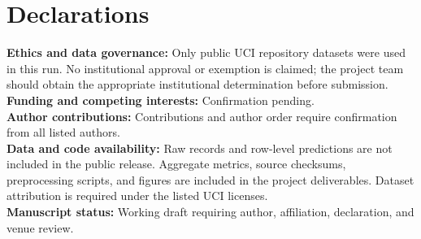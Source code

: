 \documentclass[conference]{IEEEtran}
\begin{document}
\section*{Declarations}
\textbf{Ethics and data governance:} Only public UCI repository datasets were used in this run. No institutional approval or exemption is claimed; the project team should obtain the appropriate institutional determination before submission.\\
\textbf{Funding and competing interests:} Confirmation pending.\\
\textbf{Author contributions:} Contributions and author order require confirmation from all listed authors.\\
\textbf{Data and code availability:} Raw records and row-level predictions are not included in the public release. Aggregate metrics, source checksums, preprocessing scripts, and figures are included in the project deliverables. Dataset attribution is required under the listed UCI licenses.\\
\textbf{Manuscript status:} Working draft requiring author, affiliation, declaration, and venue review.



\end{document}
